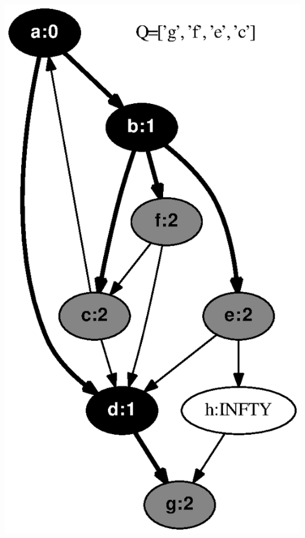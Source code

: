 \documentclass{article}
\begin{document}
\includegraphics[height=.3\textheight]{bfs_directed_classroom_03.eps}
\vspace{1em}
\end{document}
